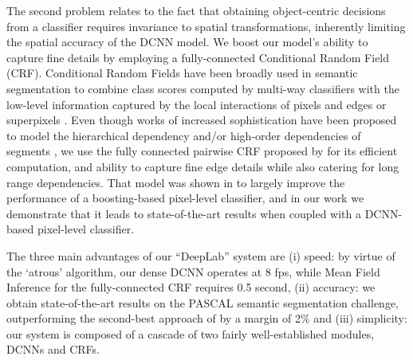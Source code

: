The second problem relates to the fact that obtaining object-centric decisions
from a classifier requires invariance to spatial transformations,
inherently limiting the spatial accuracy of the DCNN model. We boost
our model's ability to capture fine details by employing a
fully-connected Conditional Random Field (CRF). Conditional Random
Fields have been broadly used in semantic segmentation to 
combine class scores computed by multi-way classifiers with the low-level
information captured by the local interactions of pixels and edges
\citep{rother2004grabcut, shotton2009textonboost} or superpixels
\citep{lucchi2011spatial}. Even though works of increased sophistication have
been proposed to model the hierarchical dependency \citep{he2004multiscale,
  ladicky2009associative, lempitsky2011pylon} and/or high-order dependencies
of segments \citep{delong2012fast, gonfaus2010harmony, kohli2009robust, CPY13, Wang15}, we
use the fully connected pairwise CRF proposed by
\citet{krahenbuhl2011efficient} for its efficient computation, and ability to
capture fine edge details while also catering for long range dependencies. That model was shown in
\citet{krahenbuhl2011efficient} to largely improve the performance of a
boosting-based pixel-level classifier, and in our work we demonstrate that it
leads to state-of-the-art results when coupled with a DCNN-based pixel-level
classifier.


The three main advantages of our ``DeepLab'' system are (i) speed: by
virtue of the `atrous' algorithm, our dense DCNN operates at 8 fps,
while Mean Field Inference for the fully-connected CRF requires 0.5
second, (ii) accuracy: we obtain state-of-the-art results on the
PASCAL semantic segmentation challenge, outperforming the second-best
approach of \citet{mostajabi2014feedforward} by a margin of 2$\%$ and
(iii) simplicity: our system is composed of a cascade of two fairly
well-established modules, DCNNs and CRFs.


